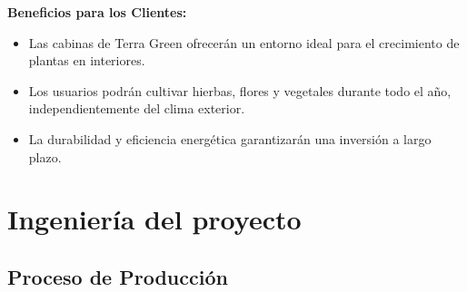 \textbf{Beneficios para los Clientes:}
\begin{itemize}
    \item Las cabinas de Terra Green ofrecerán un entorno ideal para el crecimiento de plantas en interiores.
    \item Los usuarios podrán cultivar hierbas, flores y vegetales durante todo el año, independientemente del clima exterior.
    \item La durabilidad y eficiencia energética garantizarán una inversión a largo plazo.
\end{itemize}




  

\section{Ingeniería del proyecto}

\subsection{Proceso de Producción}

